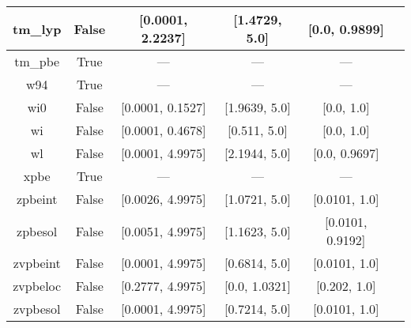 \begin{tabular}{|c|c|c|c|c|l|}
        tm\_lyp &                 False &  [0.0001, 2.2237] &     [1.4729, 5.0] &     [0.0, 0.9899] &                                       \cite{Thakkar2009_134109} \\ \hline
        tm\_pbe &                  True &               --- &               --- &               --- &                                       \cite{Thakkar2009_134109} \\ \hline
            w94 &                  True &               --- &               --- &               --- &                                           \cite{Wilson1994_337} \\ \hline
            wi0 &                 False &  [0.0001, 0.1527] &     [1.9639, 5.0] &        [0.0, 1.0] &                                           \cite{Wilson1998_523} \\ \hline
             wi &                 False &  [0.0001, 0.4678] &      [0.511, 5.0] &        [0.0, 1.0] &                                           \cite{Wilson1998_523} \\ \hline
             wl &                 False &  [0.0001, 4.9975] &     [2.1944, 5.0] &     [0.0, 0.9697] &                                         \cite{Wilson1990_12930} \\ \hline
           xpbe &                  True &               --- &               --- &               --- &                                              \cite{Xu2004_4068} \\ \hline
        zpbeint &                 False &  [0.0026, 4.9975] &     [1.0721, 5.0] &     [0.0101, 1.0] &                                    \cite{Constantin2011_233103} \\ \hline
        zpbesol &                 False &  [0.0051, 4.9975] &     [1.1623, 5.0] &  [0.0101, 0.9192] &                                    \cite{Constantin2011_233103} \\ \hline
       zvpbeint &                 False &  [0.0001, 4.9975] &     [0.6814, 5.0] &     [0.0101, 1.0] &                                    \cite{Constantin2012_194105} \\ \hline
       zvpbeloc &                 False &  [0.2777, 4.9975] &     [0.0, 1.0321] &      [0.202, 1.0] &                                          \cite{Fabiano2015_122} \\ \hline
       zvpbesol &                 False &  [0.0001, 4.9975] &     [0.7214, 5.0] &     [0.0101, 1.0] &                                    \cite{Constantin2012_194105} \\ \hline
\end{tabular}
